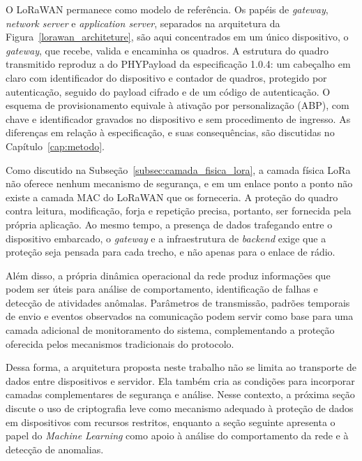 O LoRaWAN permanece como modelo de referência. Os papéis de \textit{gateway}, \textit{network server} e \textit{application server}, separados na arquitetura da Figura~\ref{lorawan_architeture}, são aqui concentrados em um único dispositivo, o \textit{gateway}, que recebe, valida e encaminha os quadros. A estrutura do quadro transmitido reproduz a do PHYPayload da especificação 1.0.4: um cabeçalho em claro com identificador do dispositivo e contador de quadros, protegido por autenticação, seguido do payload cifrado e de um código de autenticação. O esquema de provisionamento equivale à ativação por personalização (ABP), com chave e identificador gravados no dispositivo e sem procedimento de ingresso. As diferenças em relação à especificação, e suas consequências, são discutidas no Capítulo~\ref{cap:metodo}.

Como discutido na Subseção~\ref{subsec:camada_fisica_lora}, a camada física LoRa não oferece nenhum mecanismo de segurança, e em um enlace ponto a ponto não existe a camada MAC do LoRaWAN que os forneceria. A proteção do quadro contra leitura, modificação, forja e repetição precisa, portanto, ser fornecida pela própria aplicação. Ao mesmo tempo, a presença de dados trafegando entre o dispositivo embarcado, o \textit{gateway} e a infraestrutura de \textit{backend} exige que a proteção seja pensada para cada trecho, e não apenas para o enlace de rádio.

Além disso, a própria dinâmica operacional da rede produz informações que podem ser úteis para análise de comportamento, identificação de falhas e detecção de atividades anômalas. Parâmetros de transmissão, padrões temporais de envio e eventos observados na comunicação podem servir como base para uma camada adicional de monitoramento do sistema, complementando a proteção oferecida pelos mecanismos tradicionais do protocolo.

Dessa forma, a arquitetura proposta neste trabalho não se limita ao transporte de dados entre dispositivos e servidor. Ela também cria as condições para incorporar camadas complementares de segurança e análise. Nesse contexto, a próxima seção discute o uso de criptografia leve como mecanismo adequado à proteção de dados em dispositivos com recursos restritos, enquanto a seção seguinte apresenta o papel do \textit{Machine Learning} como apoio à análise do comportamento da rede e à detecção de anomalias.



